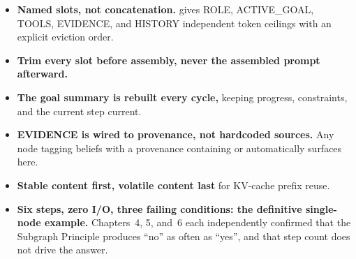 \begin{takeawaybox}
\begin{itemize}
  \item \textbf{Named slots, not concatenation.}   gives
        ROLE, ACTIVE\_GOAL, TOOLS, EVIDENCE, and HISTORY independent token
        ceilings with an explicit eviction order.

  \item \textbf{Trim every slot before assembly, never the assembled
        prompt afterward.}

  \item \textbf{The goal summary is rebuilt every cycle,} keeping
        progress, constraints, and the current step current.

  \item \textbf{EVIDENCE is wired to provenance, not hardcoded sources.}
        Any node tagging beliefs with a provenance containing
         or  automatically surfaces here.

  \item \textbf{Stable content first, volatile content last} for
        KV-cache prefix reuse.

  \item \textbf{Six steps, zero I/O, three failing conditions: the
        definitive single-node example.}  Chapters~4, 5, and~6 each
        independently confirmed that the Subgraph Principle produces
        ``no'' as often as ``yes'', and that step count does not drive
        the answer.
\end{itemize}
\end{takeawaybox}
